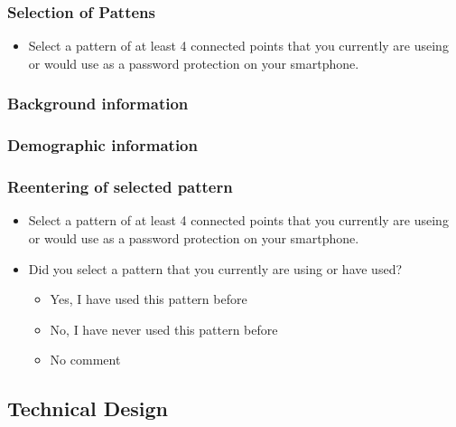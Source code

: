     \subsubsection*{Selection of Pattens}
        \begin{itemize}
            \item  Select a pattern of at least 4 connected points that you currently are useing or would use as a password protection on your smartphone. 
        \end{itemize}
    \subsubsection*{Background information}
    \subsubsection*{Demographic information} 
    \subsubsection*{Reentering of selected pattern}
        \begin{itemize}
            \item Select a pattern of at least 4 connected points that you currently are useing or would use as a password protection on your smartphone. 
            \item Did you select a pattern that you currently are using or have used?
                \begin{itemize}
                    \item Yes, I have used this pattern before
                    \item No, I have never used this pattern before
                    \item No comment
                \end{itemize}
        \end{itemize}


  \subsection{Technical Design}

